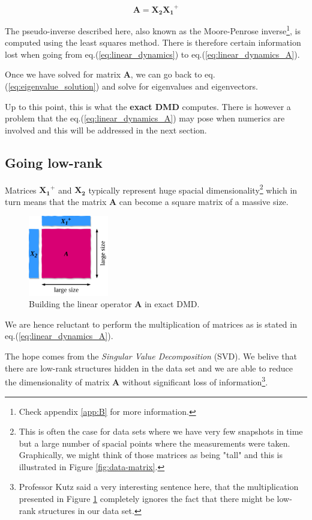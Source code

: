 \documentclass[10pt,twocolumn]{article}
\begin{document}
\begin{equation} \label{eq:linear_dynamics_A}
\bm{A} = \bm{X_2} \bm{X_1}^{+}
\end{equation}

The pseudo-inverse described here, also known as the Moore-Penrose inverse\footnote{Check appendix \ref{app:B} for more information.}, is computed using the least squares method. There is therefore certain information lost when going from eq.(\ref{eq:linear_dynamics}) to eq.(\ref{eq:linear_dynamics_A}).

Once we have solved for matrix $\bm{A}$, we can go back to eq.(\ref{eq:eigenvalue_solution}) and solve for eigenvalues and eigenvectors.

Up to this point, this is what the \textbf{exact DMD} computes. There is however a problem that the eq.(\ref{eq:linear_dynamics_A}) may pose when numerics are involved and this will be addressed in the next section. 

\subsection{Going low-rank}

Matrices $\bm{X_1}^{+}$ and $\bm{X_2}$ typically represent huge spacial dimensionality\footnote{This is often the case for data sets where we have very few snapshots in time but a large number of spacial points where the measurements were taken. Graphically, we might think of those matrices as being "tall" and this is illustrated in Figure \ref{fig:data-matrix}.} which in turn means that the matrix $\bm{A}$ can become a square matrix of a massive size. 

\begin{figure}
\centering\includegraphics[width=3.5cm]{getting-A.png}
\caption{Building the linear operator $\bm{A}$ in exact DMD.}
\label{fig:building-A}
\end{figure}

We are hence reluctant to perform the multiplication of matrices as is stated in eq.(\ref{eq:linear_dynamics_A}). 

The hope comes from the \textit{Singular Value Decomposition} (SVD). We belive that there are low-rank structures hidden in the data set and we are able to reduce the dimensionality of matrix $\bm{A}$ without significant loss of information\footnote{Professor Kutz said a very interesting sentence here, that the multiplication presented in Figure \ref{fig:building-A} completely ignores the fact that there might be low-rank structures in our data set.}.
\end{document}
